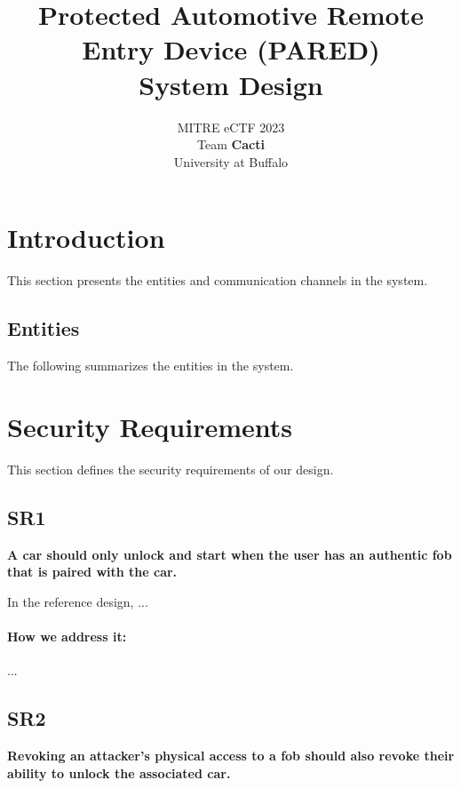 \documentclass[11pt,oneside,onecolumn,letterpaper]{article}
\title{Protected Automotive Remote Entry Device (PARED) \\ System Design}
\author{MITRE eCTF 2023\\Team \textbf{Cacti}\\ University at Buffalo}
\date{}
\begin{document}
\normalsize


\maketitle

\renewcommand{\thepage}{System Design, Team Cacti, University at Buffalo--\arabic{page}}
\setcounter{page}{1} \normalsize
%

\newcommand{\flagRollback}{\textsf{Rollback}\xspace}

\section{Introduction}

This section presents the entities and communication channels in the system.

\subsection{Entities}

The following summarizes the entities in the system.

\section{Security Requirements}

This section defines the security requirements of our design.

\subsection{SR1}
\textbf{A car should only unlock and start when the user has an authentic fob that is paired with the car.}

In the reference design, ...

\paragraph{How we address it:} ...

\subsection{SR2}
\textbf{Revoking an attacker's physical access to a fob should also revoke their ability to unlock the associated car.}
\end{document}

